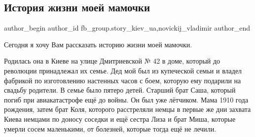  
 
 
 
 
 
\subsection{История жизни моей мамочки}
\label{sec:18_01_2022.fb.fb_group.story_kiev_ua.1.mamochka}
 
\ifcmt
 author_begin
   author_id fb_group.story_kiev_ua,novickij_vladimir
 author_end
\fi

Сегодня я хочу Вам рассказать историю жизни моей мамочки.     

Родилась она в Киеве на улице Дмитриевской № 42 в доме, который до революции
принадлежал их семье. Дед мой был из купеческой семьи и владел фабрикой по
изготовлению настенных часов с боем, которую ему подарили на свадьбу родители.
В семье было пятеро детей. Старший брат Саша, который погиб при авиакатастрофе
ещё до войны. Он был уже лётчиком.  Мама 1910 года рождения, затем брат Коля,
которого расстреляли немцы в первые же дни захвата Киева немцами по доносу
соседки и ещё сестра Лиза и брат Миша, которые умерли сосем маленькими, от
болезней, которые тогда ещё не лечили. 

\raggedcolumns
\begin{multicols}{3} %
\setlength{\parindent}{0pt}


\end{multicols} %

